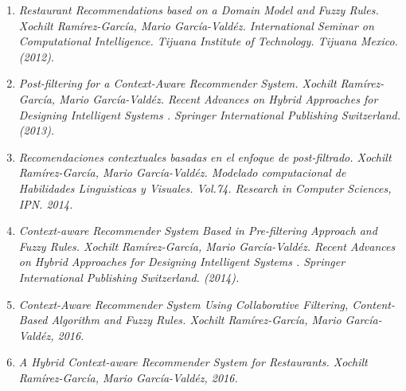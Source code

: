 
\begin{enumerate}
\item \textit{Restaurant Recommendations based on a Domain Model and Fuzzy Rules.  Xochilt Ram\'irez-Garc\'ia, Mario Garc\'ia-Vald\'ez. International Seminar on Computational Intelligence. Tijuana Institute of Technology.  Tijuana Mexico. (2012).}
\item \textit{Post-filtering for a Context-Aware Recommender System. Xochilt Ram\'irez-Garc\'ia, Mario Garc\'ia-Vald\'ez. Recent Advances on Hybrid Approaches for Designing Intelligent Systems . Springer International Publishing Switzerland. (2013).}
\item \textit{Recomendaciones contextuales basadas en el enfoque de post-filtrado. Xochilt Ram\'irez-Garc\'ia, Mario Garc\'ia-Vald\'ez. Modelado computacional de Habilidades Linguisticas y Visuales. Vol.74. Research in Computer Sciences, IPN. 2014.}
\item  \textit{Context-aware Recommender System Based in Pre-filtering Approach and Fuzzy Rules. Xochilt Ram\'irez-Garc\'ia, Mario Garc\'ia-Vald\'ez. Recent Advances on Hybrid Approaches for Designing Intelligent Systems . Springer International Publishing Switzerland. (2014).}
\item  \textit{Context-Aware Recommender System Using Collaborative Filtering, Content-Based Algorithm and Fuzzy Rules. Xochilt Ram\'irez-Garc\'ia, Mario Garc\'ia-Vald\'ez, 2016.}
\item \textit{A Hybrid Context-aware Recommender System for Restaurants. Xochilt Ram\'irez-Garc\'ia, Mario Garc\'ia-Vald\'ez, 2016.}
\end{enumerate}
